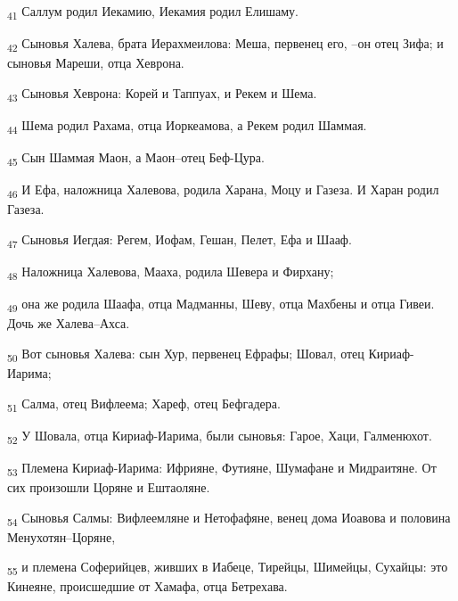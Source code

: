 \begin{tcolorbox}
\textsubscript{41} Саллум родил Иекамию, Иекамия родил Елишаму.
\end{tcolorbox}
\begin{tcolorbox}
\textsubscript{42} Сыновья Халева, брата Иерахмеилова: Меша, первенец его, --он отец Зифа; и сыновья Мареши, отца Хеврона.
\end{tcolorbox}
\begin{tcolorbox}
\textsubscript{43} Сыновья Хеврона: Корей и Таппуах, и Рекем и Шема.
\end{tcolorbox}
\begin{tcolorbox}
\textsubscript{44} Шема родил Рахама, отца Иоркеамова, а Рекем родил Шаммая.
\end{tcolorbox}
\begin{tcolorbox}
\textsubscript{45} Сын Шаммая Маон, а Маон--отец Беф-Цура.
\end{tcolorbox}
\begin{tcolorbox}
\textsubscript{46} И Ефа, наложница Халевова, родила Харана, Моцу и Газеза. И Харан родил Газеза.
\end{tcolorbox}
\begin{tcolorbox}
\textsubscript{47} Сыновья Иегдая: Регем, Иофам, Гешан, Пелет, Ефа и Шааф.
\end{tcolorbox}
\begin{tcolorbox}
\textsubscript{48} Наложница Халевова, Мааха, родила Шевера и Фирхану;
\end{tcolorbox}
\begin{tcolorbox}
\textsubscript{49} она же родила Шаафа, отца Мадманны, Шеву, отца Махбены и отца Гивеи. Дочь же Халева--Ахса.
\end{tcolorbox}
\begin{tcolorbox}
\textsubscript{50} Вот сыновья Халева: сын Хур, первенец Ефрафы; Шовал, отец Кириаф-Иарима;
\end{tcolorbox}
\begin{tcolorbox}
\textsubscript{51} Салма, отец Вифлеема; Хареф, отец Бефгадера.
\end{tcolorbox}
\begin{tcolorbox}
\textsubscript{52} У Шовала, отца Кириаф-Иарима, были сыновья: Гарое, Хаци, Галменюхот.
\end{tcolorbox}
\begin{tcolorbox}
\textsubscript{53} Племена Кириаф-Иарима: Ифрияне, Футияне, Шумафане и Мидраитяне. От сих произошли Цоряне и Ештаоляне.
\end{tcolorbox}
\begin{tcolorbox}
\textsubscript{54} Сыновья Салмы: Вифлеемляне и Нетофафяне, венец дома Иоавова и половина Менухотян--Цоряне,
\end{tcolorbox}
\begin{tcolorbox}
\textsubscript{55} и племена Соферийцев, живших в Иабеце, Тирейцы, Шимейцы, Сухайцы: это Кинеяне, происшедшие от Хамафа, отца Бетрехава.
\end{tcolorbox}
